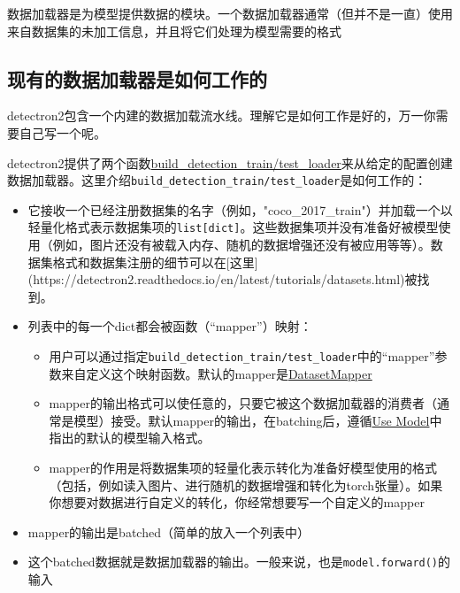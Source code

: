 \documentclass[../main.tex]{subfile}
\begin{document}
数据加载器是为模型提供数据的模块。一个数据加载器通常（但并不是一直）使用来自数据集的未加工信息，并且将它们处理为模型需要的格式

\subsection{现有的数据加载器是如何工作的}

detectron2包含一个内建的数据加载流水线。理解它是如何工作是好的，万一你需要自己写一个呢。

detectron2提供了两个函数\href{https://detectron2.readthedocs.io/en/latest/modules/data.html#detectron2.data.build_detection_train_loader}{build\_detection\_train/test\_loader}来从给定的配置创建数据加载器。这里介绍\lstinline{build_detection_train/test_loader}是如何工作的：
\begin{itemize}
    \item 它接收一个已经注册数据集的名字（例如，"coco\_2017\_train"）并加载一个以轻量化格式表示数据集项的\lstinline{list[dict]}。这些数据集项并没有准备好被模型使用（例如，图片还没有被载入内存、随机的数据增强还没有被应用等等）。数据集格式和数据集注册的细节可以在[这里](https://detectron2.readthedocs.io/en/latest/tutorials/datasets.html)被找到。
    \item 列表中的每一个dict都会被函数（“mapper”）映射：
          \begin{itemize}
              \item 用户可以通过指定\lstinline{build_detection_train/test_loader}中的“mapper”参数来自定义这个映射函数。默认的mapper是\href{https://detectron2.readthedocs.io/en/latest/modules/data.html#detectron2.data.DatasetMapper}{DatasetMapper}
              \item mapper的输出格式可以使任意的，只要它被这个数据加载器的消费者（通常是模型）接受。默认mapper的输出，在batching后，遵循\href{https://detectron2.readthedocs.io/en/latest/tutorials/models.html#model-input-format}{Use Model}中指出的默认的模型输入格式。
              \item mapper的作用是将数据集项的轻量化表示转化为准备好模型使用的格式（包括，例如读入图片、进行随机的数据增强和转化为torch张量）。如果你想要对数据进行自定义的转化，你经常想要写一个自定义的mapper
          \end{itemize}
    \item mapper的输出是batched（简单的放入一个列表中）
    \item 这个batched数据就是数据加载器的输出。一般来说，也是\lstinline{model.forward()}的输入
\end{itemize}
\end{document}
